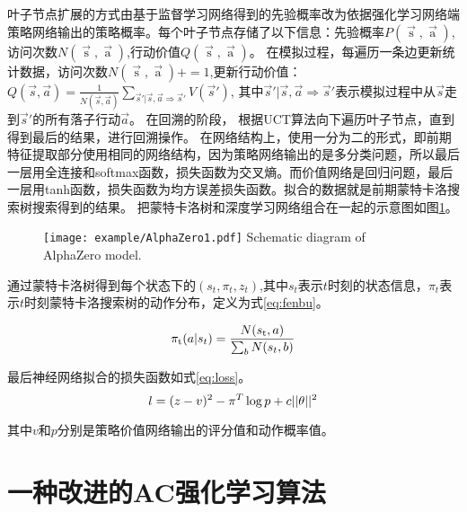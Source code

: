 叶子节点扩展的方式由基于监督学习网络得到的先验概率改为依据强化学习网络端策略网络输出的策略概率。每个叶子节点存储了以下信息：先验概率$P(\mathop s\limits^ \to  ,\mathop a\limits^ \to  )$,访问次数$N(\mathop s\limits^ \to  ,\mathop a\limits^ \to  )$,行动价值$Q(\mathop s\limits^ \to  ,\mathop a\limits^ \to  )$。
在模拟过程，每遍历一条边更新统计数据，访问次数${N(\mathop s\limits^ \to  ,\mathop a\limits^ \to  )} +=1$,更新行动价值：$Q(\vec{s},\vec{a})=\frac{1}{N(\vec{s},\vec{a})}\sum_{\vec{s}'\vert \vec{s},\vec{a}\Rightarrow \vec{s}'}V(\vec{s}')$, 其中$\vec{s}'\vert \vec{s},\vec{a} \Rightarrow \vec{s}'$表示模拟过程中从$\vec{s}$走到$\vec{s}'$的所有落子行动$\vec{a}$。
在回溯的阶段，
根据UCT算法向下遍历叶子节点，直到得到最后的结果，进行回溯操作。
在网络结构上，使用一分为二的形式，即前期特征提取部分使用相同的网络结构，因为策略网络输出的是多分类问题，所以最后一层用全连接和softmax函数，损失函数为交叉熵。而价值网络是回归问题，最后一层用tanh函数，损失函数为均方误差损失函数。拟合的数据就是前期蒙特卡洛搜索树搜索得到的结果。
把蒙特卡洛树和深度学习网络组合在一起的示意图如图\ref{fig:Alphazero1}。

\begin{figure}[htbp]
	\centering
	\texttt{[image: example/AlphaZero1.pdf]}
	{Schematic diagram of AlphaZero model.}
	\label{fig:Alphazero1}
\end{figure}

通过蒙特卡洛树得到每个状态下的$({s_t},{\pi _t},{z_t})$,其中$s_t$表示$t$时刻的状态信息，$\pi_t$表示$t$时刻蒙特卡洛搜索树的动作分布，定义为式\ref{eq:fenbu}。

\begin{equation}
\label{eq:fenbu}
{\pi _{\rm{t}}}(a|{s_t}) = \frac{{N({s_{\rm{t}}},a)}}{{\sum\nolimits_b {N({s_t},b)} }}
\end{equation}

最后神经网络拟合的损失函数如式\ref{eq:loss}。
\begin{equation}
\label{eq:loss}
l = {(z - v)^2} - {\pi ^T}\log p + c{\rm{||}}\theta {\rm{|}}{{\rm{|}}^2}
\end{equation}

其中$v$和$p$分别是策略价值网络输出的评分值和动作概率值。

\section{一种改进的AC强化学习算法}

